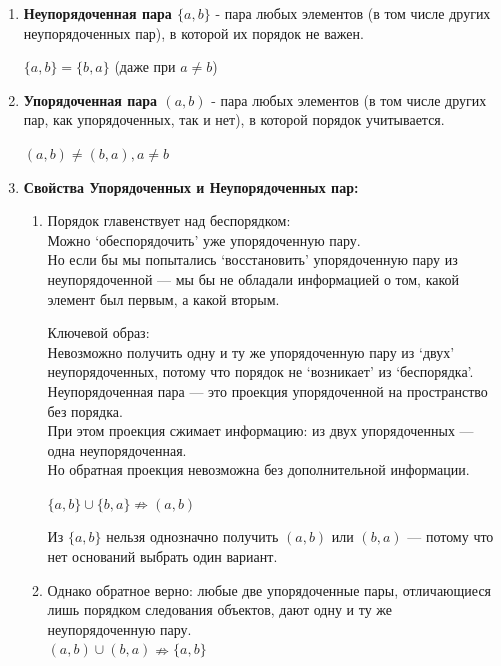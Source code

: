 \documentclass{book}
\begin{document}
\begin{enumerate}[label=\arabic*., parsep=4pt, itemsep=4pt, topsep=4pt, partopsep=0pt]

\item \textbf{Неупорядоченная пара $\{a,b\}$} - пара любых элементов (в том числе других неупорядоченных пар), в которой их порядок не важен.

$\{a,b\} = \{b,a\}$ (даже при $a \neq b$)

\item \textbf{Упорядоченная пара $(a,b)$} - пара любых элементов (в том числе других пар, как упорядоченных, так и нет), в которой порядок учитывается.

$(a,b) \neq (b,a), a \neq b$

\item \textbf{Свойства Упорядоченных и Неупорядоченных пар:}

\begin{enumerate}[label=\arabic*., parsep=4pt, itemsep=4pt, topsep=4pt, partopsep=0pt]

\item Порядок главенствует над беспорядком: \\
Можно `обеспорядочить' уже упорядоченную пару.\\
Но если бы мы попытались `восстановить' упорядоченную пару из неупорядоченной — мы бы не обладали информацией о том, какой элемент был первым, а какой вторым.

Ключевой образ:\\
Невозможно получить одну и ту же упорядоченную пару из `двух' неупорядоченных, потому что порядок не `возникает' из `беспорядка'.
Неупорядоченная пара — это проекция упорядоченной на пространство без порядка.\\
При этом проекция сжимает информацию: из двух упорядоченных — одна неупорядоченная.\\
Но обратная проекция невозможна без дополнительной информации.

$\{a, b\} \cup \{b, a\} \nRightarrow (a,b)$

Из $\{a, b\}$ нельзя однозначно получить $(a, b)$ или $(b, a)$ — потому что нет оснований выбрать один вариант.

\item Однако обратное верно: любые две упорядоченные пары, отличающиеся лишь порядком следования объектов, дают одну и ту же неупорядоченную пару. \\

$(a, b) \cup (b, a) \nRightarrow \{a,b\}$


\end{enumerate}
\end{enumerate}
\end{document}

